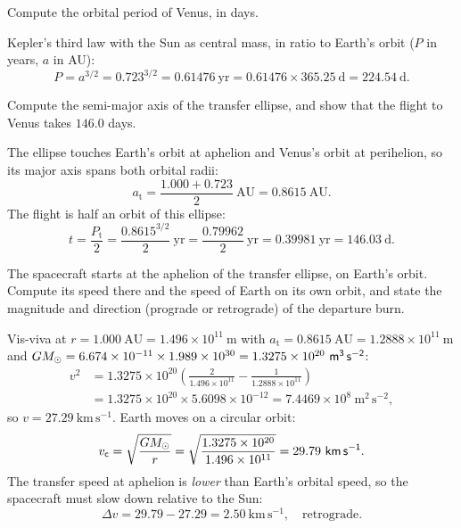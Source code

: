 \parti {} Compute the orbital period of Venus, in days.

\begin{solution}
Kepler's third law with the Sun as central mass, in ratio to Earth's orbit
($P$ in years, $a$ in AU):
\[
  P = a^{3/2} = 0.723^{3/2} = 0.61476\ \mathrm{yr} = 0.61476 \times 365.25\ \mathrm{d} = 224.54\ \mathrm{d}.
\]
\end{solution}

\parti {} Compute the semi-major axis of the transfer ellipse, and show that the flight to Venus takes $146.0$ days.

\begin{solution}
The ellipse touches Earth's orbit at aphelion and Venus's orbit at perihelion, so its major axis spans both orbital radii:
\[
  a_{\mathrm{t}} = \frac{1.000 + 0.723}{2}\ \mathrm{AU} = 0.8615\ \mathrm{AU}.
\]
The flight is half an orbit of this ellipse:
\[
  t = \frac{P_{\mathrm{t}}}{2} = \frac{0.8615^{3/2}}{2}\ \mathrm{yr} = \frac{0.79962}{2}\ \mathrm{yr}
    = 0.39981\ \mathrm{yr} = 146.03\ \mathrm{d}.
\]
\end{solution}

\parti {} The spacecraft starts at the aphelion of the transfer ellipse, on Earth's orbit.
Compute its speed there and the speed of Earth on its own orbit, and state the magnitude and direction (prograde or retrograde) of the departure burn.

\begin{solution}
Vis-viva at $r = 1.000\ \mathrm{AU} = 1.496 \times 10^{11}\ \mathrm{m}$ with
$a_{\mathrm{t}} = 0.8615\ \mathrm{AU} = 1.2888 \times 10^{11}\ \mathrm{m}$ and
$G\Msun = 6.674 \times 10^{-11} \times 1.989 \times 10^{30} = 1.3275 \times 10^{20}\ \mathrm{m^3\,s^{-2}}$:
\begin{align*}
  v^2 &= 1.3275 \times 10^{20} \left( \frac{2}{1.496 \times 10^{11}} - \frac{1}{1.2888 \times 10^{11}} \right) \\
      &= 1.3275 \times 10^{20} \times 5.6098 \times 10^{-12} = 7.4469 \times 10^{8}\ \mathrm{m^2\,s^{-2}},
\end{align*}
so $v = 27.29\ \mathrm{km\,s^{-1}}$.
Earth moves on a circular orbit:
\[
  v_{\mathrm{c}} = \sqrt{\frac{G\Msun}{r}} = \sqrt{\frac{1.3275 \times 10^{20}}{1.496 \times 10^{11}}} = 29.79\ \mathrm{km\,s^{-1}}.
\]
The transfer speed at aphelion is \emph{lower} than Earth's orbital speed, so the spacecraft must slow down relative to the Sun:
\[
  \Delta v = 29.79 - 27.29 = 2.50\ \mathrm{km\,s^{-1}}, \quad \text{retrograde}.
\]
\end{solution}


